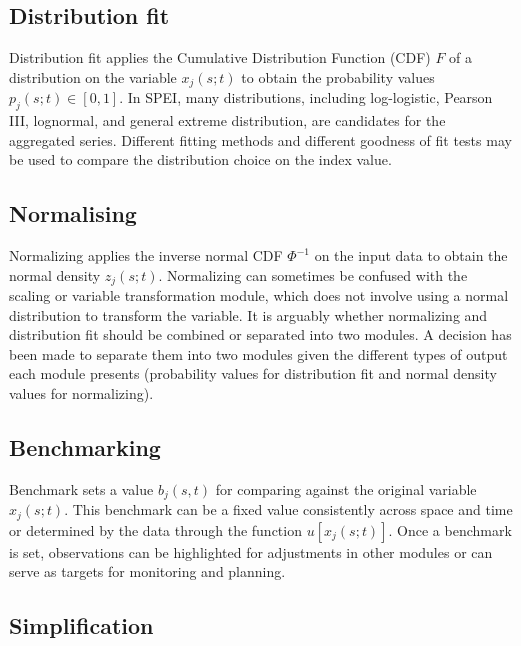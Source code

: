\documentclass[
]{interact}
\begin{document}
\hypertarget{distribution-fit}{%
\subsection{Distribution fit}\label{distribution-fit}}

Distribution fit applies the Cumulative Distribution Function (CDF)
\(F\) of a distribution on the variable \(x_j(s; t)\) to obtain the
probability values \(p_j(s;t) \in [0, 1]\). In SPEI, many distributions,
including log-logistic, Pearson III, lognormal, and general extreme
distribution, are candidates for the aggregated series. Different
fitting methods and different goodness of fit tests may be used to
compare the distribution choice on the index value.

\hypertarget{normalising}{%
\subsection{Normalising}\label{normalising}}

Normalizing applies the inverse normal CDF \(\Phi^{-1}\) on the input
data to obtain the normal density \(z_{j}(s;t)\). Normalizing can
sometimes be confused with the scaling or variable transformation
module, which does not involve using a normal distribution to transform
the variable. It is arguably whether normalizing and distribution fit
should be combined or separated into two modules. A decision has been
made to separate them into two modules given the different types of
output each module presents (probability values for distribution fit and
normal density values for normalizing).

\hypertarget{benchmarking}{%
\subsection{Benchmarking}\label{benchmarking}}

Benchmark sets a value \(b_j(s,t)\) for comparing against the original
variable \(x_j(s;t)\). This benchmark can be a fixed value consistently
across space and time or determined by the data through the function
\(u[x_j(s;t)]\). Once a benchmark is set, observations can be
highlighted for adjustments in other modules or can serve as targets for
monitoring and planning.

\hypertarget{simplification}{%
\subsection{Simplification}\label{simplification}}
\end{document}
